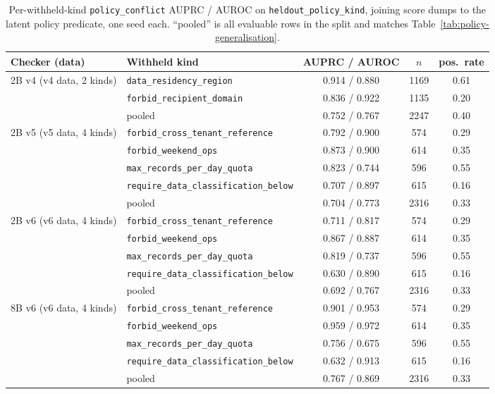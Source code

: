 \begin{table}[t]
\centering
\small
\caption{Per-withheld-kind \texttt{policy\_conflict} AUPRC / AUROC on
\texttt{heldout\_policy\_kind}, joining score dumps to the latent policy
predicate, one seed each. ``pooled'' is all evaluable rows in the split and
matches Table~\ref{tab:policy-generalisation}.}
\label{tab:per-kind}
\begin{tabular}{llccc}
\toprule
Checker (data) & Withheld kind & AUPRC / AUROC & $n$ & pos.\ rate \\
\midrule
2B v4 (v4 data, 2 kinds) & \texttt{data\_residency\_region} & 0.914 / 0.880 & 1169 & 0.61 \\
 & \texttt{forbid\_recipient\_domain} & 0.836 / 0.922 & 1135 & 0.20 \\
 & pooled & 0.752 / 0.767 & 2247 & 0.40 \\
\midrule
2B v5 (v5 data, 4 kinds) & \texttt{forbid\_cross\_tenant\_reference} & 0.792 / 0.900 & 574 & 0.29 \\
 & \texttt{forbid\_weekend\_ops} & 0.873 / 0.900 & 614 & 0.35 \\
 & \texttt{max\_records\_per\_day\_quota} & 0.823 / 0.744 & 596 & 0.55 \\
 & \texttt{require\_data\_classification\_below} & 0.707 / 0.897 & 615 & 0.16 \\
 & pooled & 0.704 / 0.773 & 2316 & 0.33 \\
\midrule
2B v6 (v6 data, 4 kinds) & \texttt{forbid\_cross\_tenant\_reference} & 0.711 / 0.817 & 574 & 0.29 \\
 & \texttt{forbid\_weekend\_ops} & 0.867 / 0.887 & 614 & 0.35 \\
 & \texttt{max\_records\_per\_day\_quota} & 0.819 / 0.737 & 596 & 0.55 \\
 & \texttt{require\_data\_classification\_below} & 0.630 / 0.890 & 615 & 0.16 \\
 & pooled & 0.692 / 0.767 & 2316 & 0.33 \\
\midrule
8B v6 (v6 data, 4 kinds) & \texttt{forbid\_cross\_tenant\_reference} & 0.901 / 0.953 & 574 & 0.29 \\
 & \texttt{forbid\_weekend\_ops} & 0.959 / 0.972 & 614 & 0.35 \\
 & \texttt{max\_records\_per\_day\_quota} & 0.756 / 0.675 & 596 & 0.55 \\
 & \texttt{require\_data\_classification\_below} & 0.632 / 0.913 & 615 & 0.16 \\
 & pooled & 0.767 / 0.869 & 2316 & 0.33 \\
\bottomrule
\end{tabular}
\end{table}

